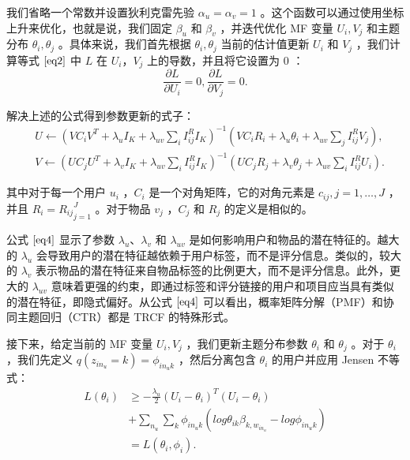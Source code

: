 我们省略一个常数并设置狄利克雷先验 $\alpha_u = \alpha_v = 1$ 。这个函数可以通过使用坐标上升来优化，也就是说，我们固定 $\beta_u$ 和 $\beta_v$ ，并迭代优化 MF 变量 $U_i , V_j$ 和主题分布 $\theta_i , \theta_j$ 。具体来说，我们首先根据 $\theta_i , \theta_j$ 当前的估计值更新 $U_i$ 和 $V_j$ ，我们计算等式 $\eqref{eq2}$ 中 $L$ 在 $U_i ， V_j$  上的导数，并且将它设置为 0 ：
\begin{equation}
\label{eq3}
\frac{\partial{L}}{\partial{U_i}}  = 0, \frac{\partial{L}}{\partial{V_j}}  = 0.
\tag{3}
\end{equation}

解决上述的公式得到参数更新的式子：
\begin{equation}  
\begin{aligned}
& U \leftarrow  \left(  VC_iV^T + \lambda_uI_K  + \lambda_{uv}\sum\limits_i I_{ij}^R I_K \right)^{-1}
(VC_iR_i + \lambda_u\theta_i + \lambda_{uv} \sum\limits_j {I_{ij}^R V_j}), \\
& V \leftarrow  \left(  UC_jU^T + \lambda_vI_K  + \lambda_{uv}\sum\limits_i I_{ij}^R I_K \right)^{-1}
(UC_jR_j + \lambda_v\theta_j + \lambda_{uv} \sum\limits_i {I_{ij}^R U_i}).
\end{aligned} 
\label{eq4}
\tag{4}
\end{equation}

其中对于每一个用户 $u_i$ ，$C_i$ 是一个对角矩阵，它的对角元素是 $c_{ij}, j= 1, \dots, J$ ，并且 $R_i = {R_{ij}} _{j=1}^J$ 。对于物品 $v_j$ ，$C_j$ 和 $R_j$ 的定义是相似的。

公式 $\eqref{eq4}$ 显示了参数 $\lambda_u$、$\lambda_v$ 和 $\lambda_{uv}$ 是如何影响用户和物品的潜在特征的。越大的 $\lambda_u$ 会导致用户的潜在特征越依赖于用户标签，而不是评分信息。类似的，较大的 $\lambda_v$ 表示物品的潜在特征来自物品标签的比例更大，而不是评分信息。此外，更大的 $\lambda_{uv}$ 意味着更强的约束，即通过标签和评分链接的用户和项目应当具有类似的潜在特征，即隐式偏好。从公式 $\eqref{eq4}$ 可以看出，概率矩阵分解（PMF）和协同主题回归（CTR）都是 TRCF 的特殊形式。

接下来，给定当前的 MF 变量 $U_i , V_j$ ，我们更新主题分布参数 $\theta_i$ 和 $\theta_j$ 。对于 $\theta_i$ ，我们先定义 $q(z_{in_u} = k) = \phi_{in_uk}$ ，然后分离包含 $\theta_i$ 的用户并应用 Jensen 不等式：
\begin{equation}  
\begin{aligned}
L(\theta_i) &\geq -\frac{\lambda_u}{2}  (U_i - \theta_i)^T  (U_i - \theta_i)  \\
& + \sum\limits_{n_u} \sum\limits_k{ \phi_{in_uk} (log{\theta_{ik} \beta_{k, w_{in_u}}  -  log{\phi_{in_uk}} })}  \\
&=L(\theta_i, \phi_i).
\end{aligned} 
\end{equation}

